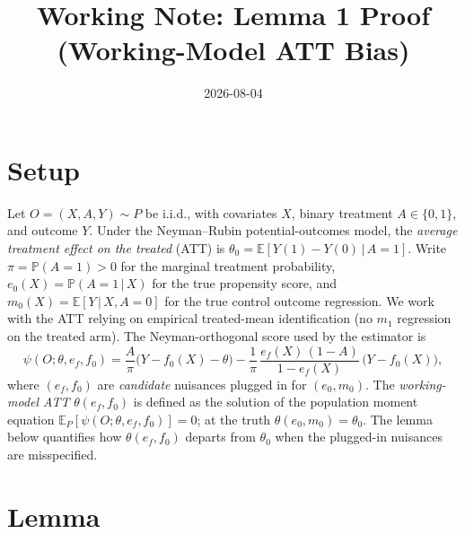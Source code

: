 \documentclass[11pt]{article}
\title{Working Note: Lemma 1 Proof \\ (Working-Model ATT Bias)}
\author{}
\date{2026-08-04}
\theoremstyle{plain}
\theoremstyle{remark}
\newcommand{\E}{\mathbb{E}}
\newcommand{\PP}{\mathbb{P}}
\newcommand{\given}{\,\vert\,}
\newcommand{\ef}{e_f}
\newcommand{\ez}{e_0}
\newcommand{\mz}{m_0}
\newcommand{\fz}{f_0}
\begin{document}
\maketitle

\section{Setup}

Let $O = (X, A, Y) \sim P$ be i.i.d., with covariates $X$, binary treatment
$A \in \{0,1\}$, and outcome $Y$. Under the Neyman--Rubin potential-outcomes
model, the \emph{average treatment effect on the treated} (ATT) is
$\theta_0 = \E[Y(1) - Y(0) \given A = 1]$. Write $\pi = \PP(A = 1) > 0$ for the
marginal treatment probability, $\ez(X) = \PP(A = 1 \given X)$ for the true
propensity score, and $\mz(X) = \E[Y \given X, A = 0]$ for the true control
outcome regression. We work with the ATT relying on empirical treated-mean
identification (no $m_1$ regression on the treated arm). The Neyman-orthogonal
score used by the estimator is
\begin{equation}\label{eq:score}
  \psi(O; \theta, \ef, \fz)
  = \frac{A}{\pi}\bigl(Y - \fz(X) - \theta\bigr)
    - \frac{1}{\pi}\,\frac{\ef(X)\,(1 - A)}{1 - \ef(X)}\,\bigl(Y - \fz(X)\bigr),
\end{equation}
where $(\ef, \fz)$ are \emph{candidate} nuisances plugged in for
$(\ez, \mz)$. The \emph{working-model ATT} $\theta(\ef, \fz)$ is defined as the
solution of the population moment equation
$\E_P[\psi(O; \theta, \ef, \fz)] = 0$; at the truth $\theta(\ez, \mz) = \theta_0$.
The lemma below quantifies how $\theta(\ef, \fz)$ departs from $\theta_0$ when
the plugged-in nuisances are misspecified.

\section{Lemma}
\end{document}
